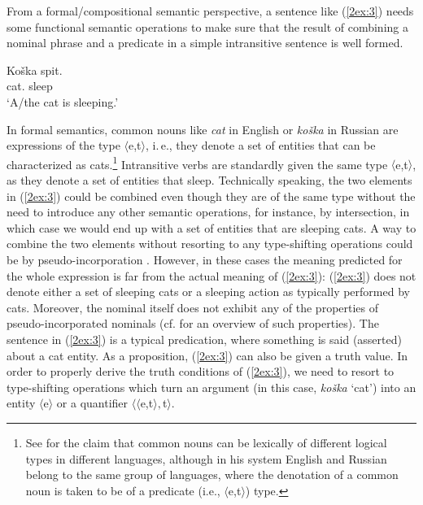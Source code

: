 \documentclass[output=paper]{langsci/langscibook}
\begin{document}
{
From a formal/compositional semantic perspective, a sentence like (\ref{2ex:3}) needs some functional semantic operations to make sure that the result of combining a nominal phrase and a predicate in a simple intransitive sentence is well formed.
}

\begin{exe}
\ex\label{2ex:3} 
\gll Ko\v{s}ka spit.\\
cat.{} sleep\\
\glt `A/the cat is sleeping.'
\end{exe}

\newpage
In formal semantics, common nouns like {\emph{cat}} in English or {\emph{ko\v{s}ka}} in Russian are expressions of the type $\langle$e,t$\rangle$, i.\,e., they denote a set of entities that can be characterized as cats.\footnote{{See \cite{chierchia:98} for the claim that common nouns can be lexically of different logical types in different languages, although in his system English and Russian belong to the same group of languages, where the denotation of a common noun is taken to be of a predicate (i.e., $\langle$e,t$\rangle$) type.}}
Intransitive verbs are standardly given the same type $\langle$e,t$\rangle$, as they denote a set of entities that sleep. Technically speaking, the two elements in (\ref{2ex:3}) could be combined even though they are of the same type without the need to introduce any other semantic operations, for instance, by intersection, in which case we would end up with a set of entities that are sleeping cats. A way to combine the two elements without resorting to any type-shifting operations could be by pseudo-incorporation \citep[e.\,g.,][]{mithun:84}. However, in these cases the meaning predicted for the whole expression is far from the actual meaning of (\ref{2ex:3}): (\ref{2ex:3}) does not denote either a set of sleeping cats or a sleeping action as typically performed by cats. Moreover, the nominal itself does not exhibit any of the properties of pseudo-incorporated nominals (cf. \citealt{borik:gehrke:15} for an overview of such properties). The sentence in (\ref{2ex:3}) is a typical predication, where something is said (asserted) about a cat entity. As a proposition, (\ref{2ex:3}) can also be given a truth value. In order to properly derive the truth conditions of (\ref{2ex:3}), we need to resort to type-shifting operations \citep{chierchia:84,partee:87} which turn an argument (in this case, {\emph{ko\v{s}ka}} `cat') into an entity $\langle$e$\rangle$ or a quantifier $\langle$$\langle$e,t$\rangle,$t$\rangle$. 
\end{document}
